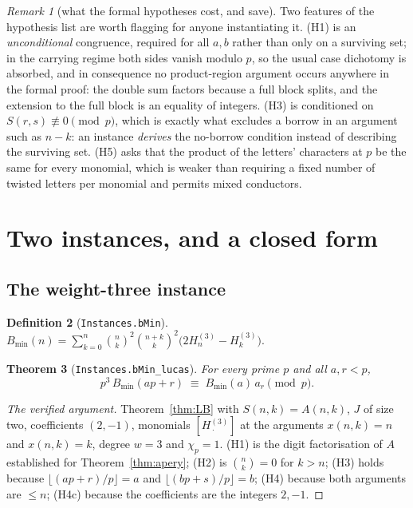 \documentclass[11pt,reqno]{amsart}
\theoremstyle{plain}
\newtheorem{theorem}{Theorem}[section]
\theoremstyle{definition}
\newtheorem{definition}[theorem]{Definition}
\theoremstyle{remark}
\newtheorem{remark}[theorem]{Remark}
\newcommand{\bin}[2]{\binom{#1}{#2}}
\newcommand{\HH}[2]{H^{(#1)}_{#2}}
\newcommand{\Ln}[1]{\texttt{#1}}
\numberwithin{equation}{section}
\begin{document}
\begin{remark}[what the formal hypotheses cost, and save]\label{rem:hyps}
Two features of the hypothesis list are worth flagging for anyone instantiating it. (H1) is
an \emph{unconditional} congruence, required for all $a,b$ rather than only on a surviving
set; in the carrying regime both sides vanish modulo $p$, so the usual case dichotomy is
absorbed, and in consequence no product-region argument occurs anywhere in the formal proof:
the double sum factors because a full block splits, and the extension to the full block is an
equality of integers. (H3) is conditioned on $S(r,s)\not\equiv0\pmod p$, which is exactly
what excludes a borrow in an argument such as $n-k$: an instance \emph{derives} the
no-borrow condition instead of describing the surviving set. (H5) asks that the product of
the letters' characters at $p$ be the same for every monomial, which is weaker than
requiring a fixed number of twisted letters per monomial and permits mixed conductors.
\end{remark}

\section{Two instances, and a closed form}
\label{sec:instances}

\subsection{The weight-three instance}

\begin{definition}[\Ln{Instances.bMin}]\label{def:bmin}
$\displaystyle B_{\min}(n)=\sum_{k=0}^{n}\bin nk^2\bin{n+k}k^2\bigl(2\HH3n-\HH3k\bigr)$.
\end{definition}

\begin{theorem}[\Ln{Instances.bMin\_lucas}]\label{thm:bmin}
For every prime $p$ and all $a,r<p$,
\[
   p^3\,B_{\min}(ap+r)\;\equiv\;B_{\min}(a)\,a_r\pmod p .
\]
\end{theorem}

\begin{proof}[The verified argument]
Theorem~\ref{thm:LB} with $S(n,k)=A(n,k)$, $J$ of size two, coefficients $(2,-1)$, monomials
$[\HH3{\,\cdot\,}]$ at the arguments $x(n,k)=n$ and $x(n,k)=k$, degree $w=3$ and $\chi_p=1$.
(H1) is the digit factorisation of $A$ established for Theorem~\ref{thm:apery}; (H2) is
$\bin nk=0$ for $k>n$; (H3) holds because $\lfloor(ap+r)/p\rfloor=a$ and
$\lfloor(bp+s)/p\rfloor=b$; (H4) because both arguments are $\le n$; (H4c) because the
coefficients are the integers $2,-1$.
\end{proof}
\end{document}
